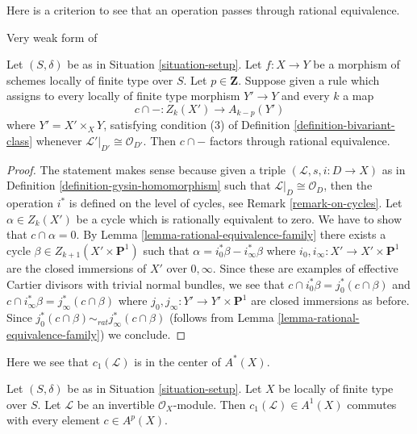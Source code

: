 \noindent
Here is a criterion to see that an operation
passes through rational equivalence.

\begin{lemma}
\label{lemma-factors-through-rational-equivalence}
\begin{reference}
Very weak form of \cite[Theorem 17.1]{F}
\end{reference}
Let $(S, \delta)$ be as in Situation \ref{situation-setup}.
Let $f : X \to Y$ be a morphism of schemes locally of finite type over $S$.
Let $p \in \mathbf{Z}$. Suppose given a rule
which assigns to every locally of finite type morphism $Y' \to Y$
and every $k$ a map
$$
c \cap - : Z_k(X') \longrightarrow A_{k - p}(Y')
$$
where $Y' = X' \times_X Y$, satisfying condition (3) of
Definition \ref{definition-bivariant-class}
whenever $\mathcal{L}'|_{D'} \cong \mathcal{O}_{D'}$. Then
$c \cap -$ factors through rational equivalence.
\end{lemma}

\begin{proof}
The statement makes sense because given a triple
$(\mathcal{L}, s, i : D \to X)$ as in
Definition \ref{definition-gysin-homomorphism}
such that $\mathcal{L}|_D \cong \mathcal{O}_D$, then
the operation $i^*$ is defined on the level of cycles, see
Remark \ref{remark-on-cycles}.
Let $\alpha \in Z_k(X')$ be a cycle which is rationally equivalent to zero.
We have to show that $c \cap \alpha = 0$. By
Lemma \ref{lemma-rational-equivalence-family}
there exists a cycle $\beta \in Z_{k + 1}(X' \times \mathbf{P}^1)$
such that $\alpha = i_0^*\beta - i_\infty^*\beta$
where $i_0, i_\infty : X' \to X' \times \mathbf{P}^1$ are the
closed immersions of $X'$ over $0, \infty$. Since these are
examples of effective Cartier divisors with trivial normal
bundles, we see that $c \cap i_0^*\beta = j_0^*(c \cap \beta)$
and $c \cap i_\infty^*\beta = j_\infty^*(c \cap \beta)$
where $j_0, j_\infty : Y' \to Y' \times \mathbf{P}^1$ are
closed immersions as before. Since
$j_0^*(c \cap \beta) \sim_{rat} j_\infty^*(c \cap \beta)$
(follows from Lemma \ref{lemma-rational-equivalence-family}) we conclude.
\end{proof}

\noindent
Here we see that $c_1(\mathcal{L})$ is in the center of $A^*(X)$.

\begin{lemma}
\label{lemma-c1-center}
Let $(S, \delta)$ be as in Situation \ref{situation-setup}.
Let $X$ be locally of finite type over $S$.
Let $\mathcal{L}$ be an invertible $\mathcal{O}_X$-module.
Then $c_1(\mathcal{L}) \in A^1(X)$ commutes with every
element $c \in A^p(X)$.
\end{lemma}

